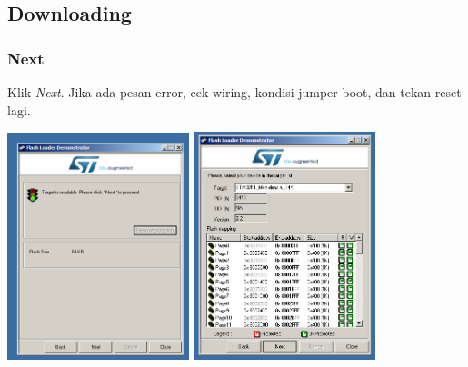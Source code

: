 \documentclass[table,dvipsnames]{beamer}
\begin{document}
	\subsection{Downloading}
	\begin{frame}
		\frametitle{Next}
		\begin{exampleblock}{}
			Klik \textit{Next}. Jika ada pesan error, cek wiring, kondisi jumper boot, dan tekan reset lagi.
		\end{exampleblock}
		\begin{center}
			\includegraphics[width=150pt]{images/demons1}
			\includegraphics[width=150pt]{images/demons2}
		\end{center}
	\end{frame}
\end{document}
